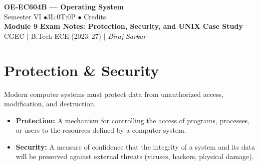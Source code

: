 \documentclass[12pt,a4paper]{article}
\begin{document}

\begin{center}
  {\LARGE\bfseries\color{myred} OE-EC604B --- Operating System}\\[5pt]
  {\normalsize\color{mydark} Semester VI \quad$\bullet$\quad 3L:0T:0P \quad$\bullet$ Credits}\\[3pt]
  {\normalsize\color{myteal}\textbf{Module 9 Exam Notes: Protection, Security, and UNIX Case Study}}\\[3pt]
  {\small\color{mydark} CGEC \;$|$\; B.Tech ECE (2023--27) \;$|$\; \textit{Biraj Sarkar}}
\end{center}
\vspace{2pt}
\noindent{\color{myred}\rule{\linewidth}{1.5pt}}
\vspace{2pt}

\hypersetup{linkcolor=mydark}
\tableofcontents
\hypersetup{linkcolor=myteal}
\newpage

\section{Protection \& Security}

Modern computer systems must protect data from unauthorized access, modification, and destruction.
\begin{itemize}[leftmargin=*, itemsep=3pt]
  \item \textbf{Protection:} A mechanism for controlling the access of programs, processes, or users to the resources defined by a computer system.
  \item \textbf{Security:} A measure of confidence that the integrity of a system and its data will be preserved against external threats (viruses, hackers, physical damage).
\end{itemize}
\end{document}
